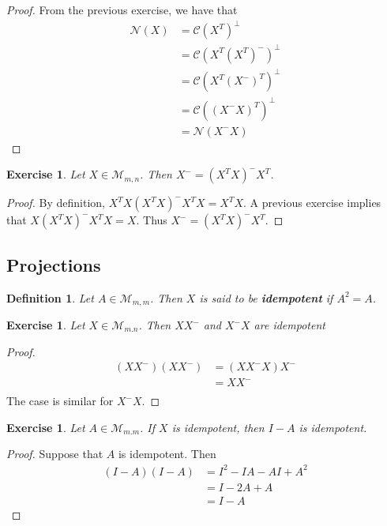 \documentclass[12pt]{amsart}
\newtheorem{defn}[thm]{Definition}
\newtheorem{ex}[thm]{Exercise}
\newcommand{\MC}{\mathcal{C}}
\newcommand{\MN}{\mathcal{N}}
\newcommand{\MM}{\mathcal{M}}
\newcommand{\z}[1]{Let ${#1} \in \MM_{m,n}$}
\begin{document}
\begin{proof}
From the previous exercise, we have that 
\begin{align*}
\MN(X) 
&= \MC(X^T)^{\perp} \\
&= \MC(X^T(X^T)^-)^{\perp} \\
&= \MC(X^T(X^-)^T)^{\perp} \\
&= \MC((X^-X)^T)^{\perp} \\
&= \MN(X^-X)
\end{align*}
\end{proof}
\vspace{2mm}

\begin{ex}
\z{X}. Then $X^- = (X^TX)^-X^T$. 
\end{ex}

\begin{proof}
By definition, $X^TX (X^TX)^- X^TX = X^TX$. A previous exercise implies that $X(X^TX)^-X^TX = X$. Thus $X^- = (X^TX)^-X^T$.
\end{proof}

\subsection{Projections}

\begin{defn}
Let $A \in \MM_{m,m}$. Then $X$ is said to be \textbf{idempotent} if $A^2 = A$.
\end{defn}

\begin{ex}
Let $X \in \MM_{m.n}$. Then $XX^-$ and $X^-X$ are idempotent
\end{ex}

\begin{proof}
\begin{align*}
(XX^-)(XX^-) 
&= (XX^-X)X^- \\
&= XX^-\\
\end{align*} The case is similar for $X^-X$.
\end{proof}

\begin{ex}
Let $A \in \MM_{m.m}$. If $X$ is idempotent, then $I-A$ is idempotent.
\end{ex}

\begin{proof} 
Suppose that $A$ is idempotent. Then
\begin{align*}
(I-A)(I-A) 
&= I^2 -IA -AI + A^2 \\
&= I -2A +A \\
&= I -A
\end{align*}
\end{proof}
\end{document}
